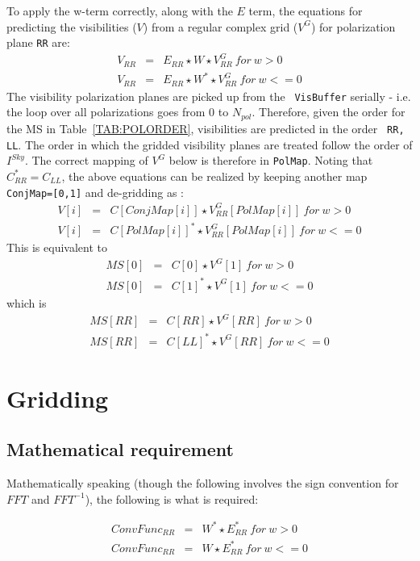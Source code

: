 \documentclass[11pt,epsf]{article}
\begin{document}
To apply the w-term correctly, along with the $E$ term, the equations
for predicting the visibilities ($V$) from a regular complex grid
($V^G$) for polarization plane {\tt RR} are:
\begin{eqnarray}
 V_{RR} &=& E_{RR} \star W \star V^G_{RR}~for~w>0  \nonumber \\
 V_{RR} &=& E_{RR} \star W^* \star V^G_{RR}~for~w<=0 
\end{eqnarray}
The visibility polarization planes are picked up from the {\tt
  VisBuffer} serially - i.e. the loop over all polarizations goes from
0 to $N_{pol}$.  Therefore, given the order for the MS in
Table~\ref{TAB:POLORDER}, visibilities are predicted in the order {\tt
  RR, LL}.  The order in which the gridded visibility planes are
treated follow the order of $I^{Sky}$.  The correct mapping of $V^G$
below is therefore in {\tt PolMap}.  Noting that $C_{RR}^* = C_{LL}$,
the above equations can be realized by keeping another map {\tt
  ConjMap=[0,1]} and de-gridding as :
\begin{eqnarray}
 V[i] &=& C[ConjMap[i]] \star V^G_{RR}[PolMap[i]]~for~w>0 \nonumber \\
 V[i] &=& C[PolMap[i]]^* \star V^G_{RR}[PolMap[i]]~for~w<=0 
\end{eqnarray}
This is equivalent to
\begin{eqnarray}
 MS[0]&=&C[0] \star V^G[1]~for~w>0\nonumber\\
 MS[0]&=&C[1]^* \star V^G[1]~for~w<=0
\end{eqnarray}
which is 
\begin{eqnarray}
 MS[RR]&=&C[RR] \star V^G[RR]~for~w>0\nonumber\\
 MS[RR]&=&C[LL]^* \star V^G[RR]~for~w<=0
\end{eqnarray}







\section{Gridding}
\subsection{Mathematical requirement}

Mathematically speaking (though the following involves the sign
convention for $FFT$ and $FFT^{-1}$), the following is what is
required:

\begin{eqnarray}
ConvFunc_{RR} &=& W^* \star E^*_{RR}~for~w > 0 \nonumber \\
ConvFunc_{RR} &=& W \star E^*_{RR}~for~w <= 0 
\end{eqnarray}
\end{document}
